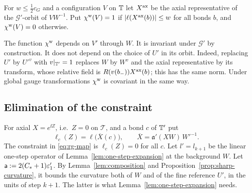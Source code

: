 \begin{definition}\label{def:chi-w}
For $w\le\frac12c_G$ and a configuration $V$ on $\mathbb T$ let $X^{\rm ax}$ be the axial representative of the $\mathcal G'$-orbit of $VW^{-1}$. Put $\chi^{\rm w}(V)=1$ if $|\ell(X^{\rm ax}(b))|\le w$ for all bonds $b$, and $\chi^{\rm w}(V)=0$ otherwise.
\end{definition}

The function $\chi^{\rm w}$ depends on $V'$ through $W$. It is invariant under $\mathcal G'$ by construction. It does not depend on the choice of $U'$ in its orbit. Indeed, replacing $U'$ by $U'^v$ with $v|_{\mathbb T'}=1$ replaces $W$ by $W^{v}$ and the axial representative by its transform, whose relative field is $R(v(b_-))X^{\rm ax}(b)$; this has the same norm. Under global gauge transformations $\chi^{\rm w}$ is covariant in the same way.

\subsection{Elimination of the constraint}

For axial $X=e^{\ii Z}$, i.e.\ $Z=0$ on $\mathcal T$, and a bond $c$ of $\mathbb T'$ put
\[
\ell_c(Z)=\ell\big(\overline X(c)\big),\qquad\overline X=\mathfrak a'(XW)\,W'^{-1}.
\]
The constraint in \eqref{eq:rg-map} is $\ell_c(Z)=0$ for all $c$. Let $l'=l_{k+1}$ be the linear one-step operator of Lemma~\ref{lem:one-step-expansion} at the background $W$. Let $\mathsf a:=2(C_*+1)\varepsilon'_1$. By Lemma~\ref{lem:composition} and Proposition~\ref{prop:sharp-curvature}, it bounds the curvature both of $W$ and of the fine reference $U'$, in the units of step $k+1$. The latter is what Lemma~\ref{lem:one-step-expansion} needs.

